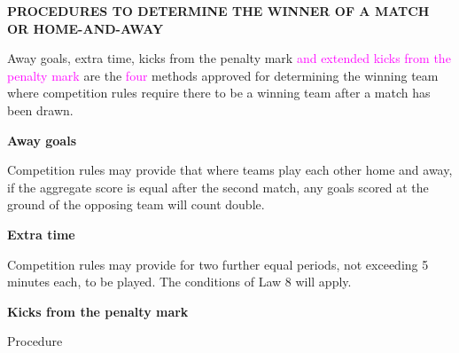 \clearpage
\sffamily
{\bfseries\color[rgb]{0.4,0.4,0.4}
PROCEDURES TO DETERMINE THE WINNER OF A MATCH OR HOME-AND-AWAY }
{}

\bigskip

Away goals, extra time, kicks from the penalty mark \textcolor{magenta}{and extended kicks from the penalty mark} are the \textcolor{magenta}{four} methods approved for determining the winning team where competition rules require there to be a winning team after a match has been drawn.

\bigskip

{\bfseries Away goals}

Competition rules may provide that where teams play each other home and away, if the aggregate score is equal after the second match, any goals scored at the ground of the opposing team will count double.

\bigskip

{\bfseries Extra time}

Competition rules may provide for two further equal periods, not exceeding 5 minutes each, to be played. The conditions of Law 8 will apply. 

\bigskip

{\bfseries Kicks from the penalty mark }

Procedure

\headlinebox
 
